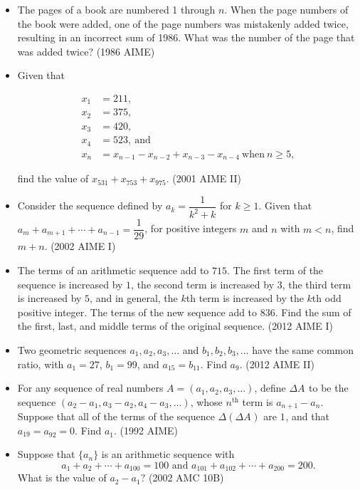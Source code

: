 \documentclass{article}
\begin{document}
\begin{itemize}
\item The pages of a book are numbered 1 through $n$. When the page numbers of the book were added, one of the page numbers was mistakenly added twice, resulting in an incorrect sum of 1986. What was the number of the page that was added twice? (1986 AIME)

\item Given that


\begin{align*}x_{1}&=211,\\
x_{2}&=375,\\
x_{3}&=420,\\
x_{4}&=523,\ \text{and}\\
x_{n}&=x_{n-1}-x_{n-2}+x_{n-3}-x_{n-4}\ \text{when}\ n\geq5, \end{align*}


find the value of $x_{531}+x_{753}+x_{975}$. (2001 AIME II)

\item Consider the sequence defined by $a_k =\dfrac{1}{k^2+k}$ for $k\geq 1$. Given that $a_m+a_{m+1}+\cdots+a_{n-1}=\dfrac{1}{29}$, for positive integers $m$ and $n$ with $m<n$, find $m+n$. (2002 AIME I)

\item The terms of an arithmetic sequence add to $715$. The first term of the sequence is increased by $1$, the second term is increased by $3$, the third term is increased by $5$, and in general, the $k$th term is increased by the $k$th odd positive integer. The terms of the new sequence add to $836$. Find the sum of the first, last, and middle terms of the original sequence. (2012 AIME I)

\item Two geometric sequences $a_1, a_2, a_3, \ldots$ and $b_1, b_2, b_3, \ldots$ have the same common ratio, with $a_1 = 27$, $b_1=99$, and $a_{15}=b_{11}$. Find $a_9$. (2012 AIME II)

\item For any sequence of real numbers $A=(a_1,a_2,a_3,\ldots)$, define $\Delta A^{}_{}$ to be the sequence $(a_2-a_1,a_3-a_2,a_4-a_3,\ldots)$, whose $n^{\mbox{th}}_{}$ term is $a_{n+1}-a_n^{}$. Suppose that all of the terms of the sequence $\Delta(\Delta A^{}_{})$ are $1^{}_{}$, and that $a_{19}=a_{92}^{}=0$. Find $a_1^{}$. (1992 AIME)


\item Suppose that $\{a_n\}$ is an arithmetic sequence with
$$ a_1+a_2+\cdots+a_{100}=100 \text{ and } a_{101}+a_{102}+\cdots+a_{200}=200.$$
What is the value of $a_2 - a_1 ?$ (2002 AMC 10B)


\end{itemize}
\end{document}
